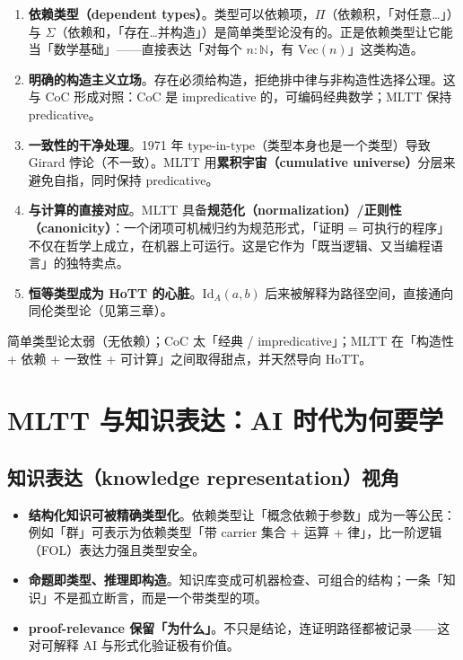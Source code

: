 \documentclass[10pt, openany]{book}
\begin{document}
\begin{enumerate}
  \item \textbf{依赖类型（dependent types）}。类型可以依赖项，$\Pi$（依赖积，「对任意\ldots」）与 $\Sigma$（依赖和，「存在\ldots 并构造」）是简单类型论没有的。正是依赖类型让它能当「数学基础」——直接表达「对每个 $n:\mathbb{N}$，有 $\mathrm{Vec}(n)$」这类构造。
  \item \textbf{明确的构造主义立场}。存在必须给构造，拒绝排中律与非构造性选择公理。这与 CoC 形成对照：CoC 是 impredicative 的，可编码经典数学；MLTT 保持 predicative。
  \item \textbf{一致性的干净处理}。1971 年 $\mathrm{type}$-in-$\mathrm{type}$（类型本身也是一个类型）导致 Girard 悖论（不一致）。MLTT 用\textbf{累积宇宙（cumulative universe）}分层来避免自指，同时保持 predicative。
  \item \textbf{与计算的直接对应}。MLTT 具备\textbf{规范化（normalization）/正则性（canonicity）}：一个闭项可机械归约为规范形式，「证明 = 可执行的程序」不仅在哲学上成立，在机器上可运行。这是它作为「既当逻辑、又当编程语言」的独特卖点。
  \item \textbf{恒等类型成为 HoTT 的心脏}。$\mathrm{Id}_A(a,b)$ 后来被解释为路径空间，直接通向同伦类型论（见第三章）。
\end{enumerate}

\begin{principle}
  简单类型论太弱（无依赖）；CoC 太「经典 / impredicative」；MLTT 在「构造性 + 依赖 + 一致性 + 可计算」之间取得甜点，并天然导向 HoTT。
\end{principle}

\section{MLTT 与知识表达：AI 时代为何要学}

\subsection{知识表达（knowledge representation）视角}

\begin{itemize}
  \item \textbf{结构化知识可被精确类型化}。依赖类型让「概念依赖于参数」成为一等公民：例如「群」可表示为依赖类型「带 carrier 集合 + 运算 + 律」，比一阶逻辑（FOL）表达力强且类型安全。
  \item \textbf{命题即类型、推理即构造}。知识库变成可机器检查、可组合的结构；一条「知识」不是孤立断言，而是一个带类型的项。
  \item \textbf{proof-relevance 保留「为什么」}。不只是结论，连证明路径都被记录——这对可解释 AI 与形式化验证极有价值。
\end{itemize}
\end{document}
